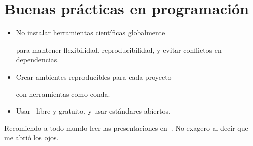 \chapter{Buenas prácticas en programación}\label{sec:lessons}

\begin{itemize}
  \item No instalar herramientas científicas globalmente

  para mantener flexibilidad, reproducibilidad, y evitar conflictos en dependencias.

  \item Crear ambientes reproducibles para cada proyecto

  con herramientas como conda.

  \item Usar \software~libre y gratuito, y usar estándares abiertos.
\end{itemize}

Recomiendo a todo mundo leer las presentaciones en~\autocite{Datseris2025}.
No exagero al decir que me abrió los ojos.

